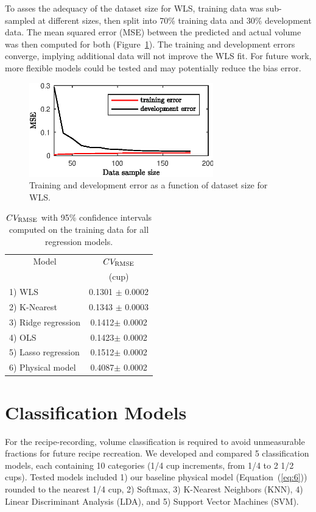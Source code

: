 \documentclass[twocolumn,10pt]{article}
\begin{document}
To asses the adequacy of the dataset size for WLS, training data was sub-sampled at different sizes, then split into 70\% training data and 30\% development data. The mean squared error (MSE) between the predicted and actual volume was then computed for both (Figure~\ref{fig:ModelEval}). The training and development errors converge, implying additional data will not improve the WLS fit. For future work, more flexible models could be tested and may potentially reduce the bias error.

\begin{figure}
\centering
 \includegraphics[width=80mm]{dataSampleSizeWLS}
 \caption{Training and development error as a function of dataset size for WLS.}
 \label{fig:ModelEval}
\end{figure}

\begin{table}
\begin{center}
\begin{tabular}{|c|c|}
\hline
 Model & $CV_{\hbox{\scriptsize RMSE}}$ \\ &(cup) \\
\hline
 \multicolumn{1}{|l|}{1) WLS} & 0.1301 $\pm$ 0.0002\\
 \hline
 \multicolumn{1}{|l|}{2) K-Nearest} & 0.1343 $\pm$ 0.0003\\
 \hline
 \multicolumn{1}{|l|}{3) Ridge regression} & 0.1412$\pm$ 0.0002\\
\hline
 \multicolumn{1}{|l|}{4) OLS} & 0.1423$\pm$ 0.0002\\
 \hline
 \multicolumn{1}{|l|}{5) Lasso regression} & 0.1512$\pm$ 0.0002\\
 \hline
 \multicolumn{1}{|l|}{6) Physical model} & 0.4087$ \pm$ 0.0002\\
 \hline
\end{tabular}
\caption{$CV_{\hbox{\scriptsize RMSE}}$ with 95\% confidence intervals computed on the training data for all regression models.}
\label{t:regressionDevError}
\end{center}
\end{table}

\section{Classification Models}
\label{classifcation}
For the recipe-recording, volume classification is required to avoid unmeasurable fractions for future recipe recreation. We developed and compared 5 classification models, each containing 10 categories (1/4 cup increments, from 1/4 to 2 1/2 cups). Tested models included 1) our baseline physical model (Equation~(\ref{eq:6})) rounded to the nearest 1/4 cup, 2) Softmax, 3) K-Nearest Neighbors (KNN), 4) Linear Discriminant Analysis (LDA), and 5) Support Vector Machines (SVM). 
  
\end{document}
